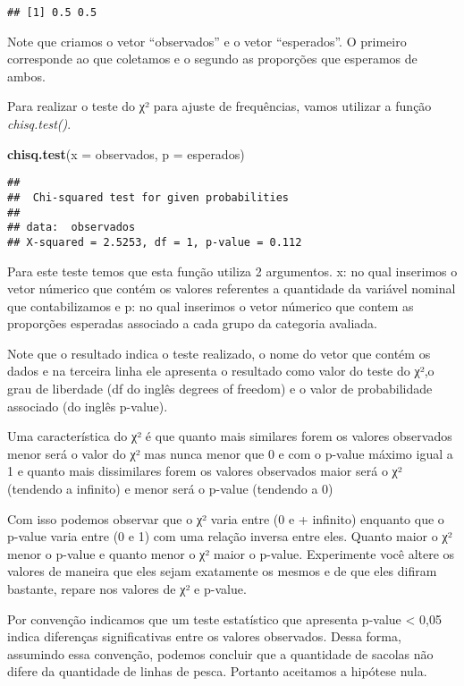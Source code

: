 \documentclass[]{book}
\newenvironment{Shaded}{\begin{snugshade}}{\end{snugshade}}
\newcommand{\DataTypeTok}[1]{\textcolor[rgb]{0.13,0.29,0.53}{#1}}
\newcommand{\KeywordTok}[1]{\textcolor[rgb]{0.13,0.29,0.53}{\textbf{#1}}}
\newcommand{\NormalTok}[1]{#1}
\begin{document}
\begin{verbatim}
## [1] 0.5 0.5
\end{verbatim}

Note que criamos o vetor ``observados'' e o vetor ``esperados''. O primeiro corresponde ao que coletamos e o segundo as proporções que esperamos de ambos.

Para realizar o teste do χ² para ajuste de frequências, vamos utilizar a função \emph{chisq.test()}.

\begin{Shaded}
\begin{Highlighting}[]
\KeywordTok{chisq.test}\NormalTok{(}\DataTypeTok{x =}\NormalTok{ observados, }\DataTypeTok{p =}\NormalTok{ esperados)}
\end{Highlighting}
\end{Shaded}

\begin{verbatim}
## 
##  Chi-squared test for given probabilities
## 
## data:  observados
## X-squared = 2.5253, df = 1, p-value = 0.112
\end{verbatim}

Para este teste temos que esta função utiliza 2 argumentos. x: no qual inserimos o vetor númerico que contém os valores referentes a quantidade da variável nominal que contabilizamos e p: no qual inserimos o vetor númerico que contem as proporções esperadas associado a cada grupo da categoria avaliada.

Note que o resultado indica o teste realizado, o nome do vetor que contém os dados e na terceira linha ele apresenta o resultado como valor do teste do χ²,o grau de liberdade (df do inglês degrees of freedom) e o valor de probabilidade associado (do inglês p-value).

Uma característica do χ² é que quanto mais similares forem os valores observados menor será o valor do χ² mas nunca menor que 0 e com o p-value máximo igual a 1 e quanto mais dissimilares forem os valores observados maior será o χ² (tendendo a infinito) e menor será o p-value (tendendo a 0)

Com isso podemos observar que o χ² varia entre (0 e + infinito) enquanto que o p-value varia entre (0 e 1) com uma relação inversa entre eles. Quanto maior o χ² menor o p-value e quanto menor o χ² maior o p-value. Experimente você altere os valores de maneira que eles sejam exatamente os mesmos e de que eles difiram bastante, repare nos valores de χ² e p-value.

Por convenção indicamos que um teste estatístico que apresenta p-value \textless{} 0,05 indica diferenças significativas entre os valores observados. Dessa forma, assumindo essa convenção, podemos concluir que a quantidade de sacolas não difere da quantidade de linhas de pesca. Portanto aceitamos a hipótese nula.
\end{document}
